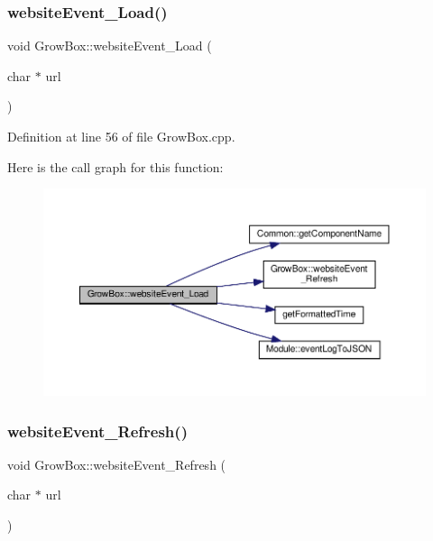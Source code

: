 \mbox{\label{class_grow_box_a486cdc90cf59c3059c96b3f021eec5d5}} 
\subsubsection{\texorpdfstring{website\+Event\+\_\+\+Load()}{websiteEvent\_Load()}\hspace{0.1cm}{\footnotesize\ttfamily [2/2]}}
{\footnotesize\ttfamily void Grow\+Box\+::website\+Event\+\_\+\+Load (\begin{DoxyParamCaption}\item[{char $\ast$}]{url }\end{DoxyParamCaption})}



Definition at line 56 of file Grow\+Box.\+cpp.

Here is the call graph for this function\+:
\nopagebreak
\begin{figure}[H]
\begin{center}
\leavevmode
\includegraphics[width=350pt]{class_grow_box_a486cdc90cf59c3059c96b3f021eec5d5_cgraph}
\end{center}
\end{figure}
\mbox{\label{class_grow_box_aa75f2898bbac66ab08cb257e4285f51e}} 
\subsubsection{\texorpdfstring{website\+Event\+\_\+\+Refresh()}{websiteEvent\_Refresh()}\hspace{0.1cm}{\footnotesize\ttfamily [1/2]}}
{\footnotesize\ttfamily void Grow\+Box\+::website\+Event\+\_\+\+Refresh (\begin{DoxyParamCaption}\item[{char $\ast$}]{url }\end{DoxyParamCaption})}

